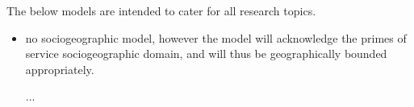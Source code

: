 The below models are intended to cater for all research topics.

\begin{itemize}
\item no sociogeographic model, however the model will acknowledge the primes of service sociogeographic domain, and will thus be geographically bounded appropriately.

...
\end{itemize}
